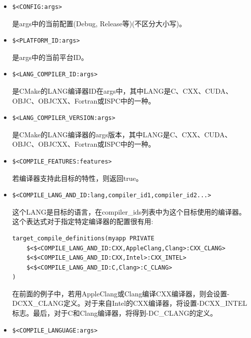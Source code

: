 \begin{itemize}
\item 
\begin{lstlisting}[style=styleCMake]
$<CONFIG:args>
\end{lstlisting}
是args中的当前配置(Debug, Release等)(不区分大小写)。

\item 
\begin{lstlisting}[style=styleCMake]
$<PLATFORM_ID:args>
\end{lstlisting}
是args中的当前平台ID。

\item 
\begin{lstlisting}[style=styleCMake]
$<LANG_COMPILER_ID:args>
\end{lstlisting}
是CMake的LANG编译器ID在args中，其中LANG是C、CXX、CUDA、OBJC、OBJCXX、Fortran或ISPC中的一种。

\item 
\begin{lstlisting}[style=styleCMake]
$<LANG_COMPILER_VERSION:args>
\end{lstlisting}
是CMake的LANG编译器的args版本，其中LANG是C、CXX、CUDA、OBJC、OBJCXX、Fortran或ISPC中的一种。

\item 
\begin{lstlisting}[style=styleCMake]
$<COMPILE_FEATURES:features>
\end{lstlisting}
若编译器支持此目标的特性，则返回true。

\item 
\begin{lstlisting}[style=styleCMake]
$<COMPILE_LANG_AND_ID:lang,compiler_id1,compiler_id2...>
\end{lstlisting}
这个LANG是目标的语言，在compiler\_ids列表中为这个目标使用的编译器。这个表达式对于指定特定编译器的配置很有用:

\begin{lstlisting}[style=styleCMake]
target_compile_definitions(myapp PRIVATE
	$<$<COMPILE_LANG_AND_ID:CXX,AppleClang,Clang>:CXX_CLANG>
	$<$<COMPILE_LANG_AND_ID:CXX,Intel>:CXX_INTEL>
	$<$<COMPILE_LANG_AND_ID:C,Clang>:C_CLANG>
)
\end{lstlisting}

在前面的例子中，若用AppleClang或Clang编译CXX编译器，则会设置-DCXX\_CLANG定义。对于来自Intel的CXX编译器，将设置-DCXX\_INTEL标志。最后，对于C和Clang编译器，将得到-DC\_CLANG的定义。

\item 
\begin{lstlisting}[style=styleCMake]
$<COMPILE_LANGUAGE:args>
\end{lstlisting}


\end{itemize}
